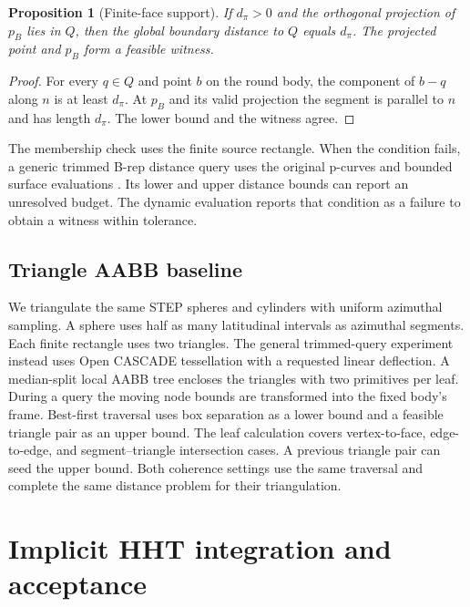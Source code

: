 \documentclass[10pt,a4paper]{article}
\newtheorem{proposition}{Proposition}
\begin{document}
\begin{proposition}[Finite-face support]
If \(d_\pi>0\) and the orthogonal projection of \(p_B\) lies in \(Q\), then the global boundary distance to \(Q\) equals \(d_\pi\). The projected point and \(p_B\) form a feasible witness.
\end{proposition}
\begin{proof}
For every \(q\in Q\) and point \(b\) on the round body, the component of \(b-q\) along \(n\) is at least \(d_\pi\). At \(p_B\) and its valid projection the segment is parallel to \(n\) and has length \(d_\pi\). The lower bound and the witness agree.
\end{proof}

The membership check uses the finite source rectangle. When the condition fails, a generic trimmed B-rep distance query uses the original p-curves and bounded surface evaluations \cite{chen2024,crozet2018}. Its lower and upper distance bounds can report an unresolved budget. The dynamic evaluation reports that condition as a failure to obtain a witness within tolerance.

\subsection{Triangle AABB baseline}

We triangulate the same STEP spheres and cylinders with uniform azimuthal sampling. A sphere uses half as many latitudinal intervals as azimuthal segments. Each finite rectangle uses two triangles. The general trimmed-query experiment instead uses Open CASCADE tessellation with a requested linear deflection. A median-split local AABB tree encloses the triangles with two primitives per leaf. During a query the moving node bounds are transformed into the fixed body's frame. Best-first traversal uses box separation as a lower bound and a feasible triangle pair as an upper bound. The leaf calculation covers vertex-to-face, edge-to-edge, and segment--triangle intersection cases. A previous triangle pair can seed the upper bound. Both coherence settings use the same traversal and complete the same distance problem for their triangulation.

\section{Implicit HHT integration and acceptance}
\end{document}
